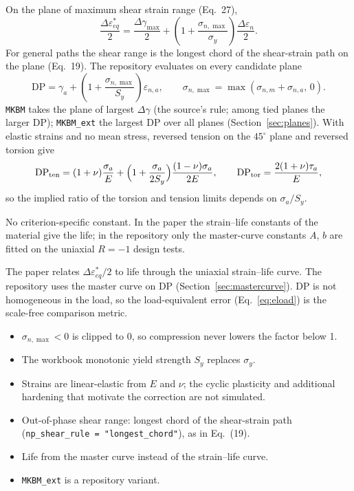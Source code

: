  On the plane of maximum shear strain range (Eq.~27),
\begin{equation}
\frac{\Delta\varepsilon^*_{eq}}{2}=\frac{\Delta\gamma_{\max}}{2}
+\left(1+\frac{\sigma_{n,\max}}{\sigma_y}\right)\frac{\Delta\varepsilon_n}{2} .
\label{eq:mkbm-main}
\end{equation}
For general paths the shear range is the longest chord of the shear-strain path on the plane
(Eq.~19). The repository evaluates on every candidate plane
\begin{equation}
\mathrm{DP}=\gamma_a+\left(1+\frac{\sigma_{n,\max}}{S_y}\right)\varepsilon_{n,a},\qquad
\sigma_{n,\max}=\max(\sigma_{n,m}+\sigma_{n,a},\,0).
\label{eq:mkbm-dp}
\end{equation}
\texttt{MKBM} takes the plane of largest $\Delta\gamma$ (the source's rule; among tied planes the
larger DP); \texttt{MKBM\_ext} the largest DP over all planes (Section~\ref{sec:planes}). With
elastic strains and no mean stress, reversed tension on the $45^\circ$ plane and reversed torsion
give
\begin{equation}
\mathrm{DP}_\text{ten}=(1+\nu)\frac{\sigma_a}{E}+\Bigl(1+\frac{\sigma_a}{2S_y}\Bigr)\frac{(1-\nu)\sigma_a}{2E},\qquad
\mathrm{DP}_\text{tor}=\frac{2(1+\nu)\tau_a}{E} ,
\label{eq:mkbm-limits}
\end{equation}
so the implied ratio of the torsion and tension limits depends on $\sigma_a/S_y$.

 No criterion-specific constant. In the paper the strain--life
constants of the material give the life; in the repository only the master-curve constants $A$,
$b$ are fitted on the uniaxial $R=-1$ design tests.

 The paper relates $\Delta\varepsilon^*_{eq}/2$ to life through the uniaxial
strain--life curve. The repository uses the master curve on DP (Section~\ref{sec:mastercurve}). DP
is not homogeneous in the load, so the load-equivalent error (Eq.~\eqref{eq:eload}) is the
scale-free comparison metric.

\begin{itemize}
\item $\sigma_{n,\max}<0$ is clipped to 0, so compression never lowers the factor below 1.
\item The workbook monotonic yield strength $S_y$ replaces $\sigma_y$.
\item Strains are linear-elastic from $E$ and $\nu$; the cyclic plasticity and additional hardening
  that motivate the correction are not simulated.
\item Out-of-phase shear range: longest chord of the shear-strain path
  (\texttt{np\_shear\_rule = "longest\_chord"}), as in Eq.~(19).
\item Life from the master curve instead of the strain--life curve.
\item \texttt{MKBM\_ext} is a repository variant.
\end{itemize}

